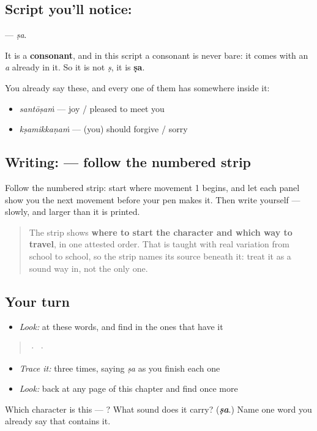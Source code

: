 \subsection*{Script you'll notice: }
\textbf{} — \emph{ṣa}.

It is a \textbf{consonant}, and in this script a consonant is never bare: it comes with an \emph{a} already in it. So it is not \emph{ṣ}, it is \textbf{ṣa}.

You already say these, and every one of them has  somewhere inside it:

\begin{itemize}
\raggedright
  \item \textbf{} \emph{santōṣaṁ} — joy / pleased to meet you
  \item \textbf{} \emph{kṣamikkaṇaṁ} — (you) should forgive / sorry
\end{itemize}

\subsection*{Writing:  — follow the numbered strip}

Follow the numbered strip: start where movement 1 begins, and let each panel show you the next movement before your pen makes it. Then write  yourself — slowly, and larger than it is printed.

\begin{quote}
The strip shows \textbf{where to start the character and which way to travel}, in one attested order. That is taught with real variation from school to school, so the strip names its source beneath it: treat it as a sound way in, not the only one.
\end{quote}

\subsection*{Your turn}
\begin{itemize}
\raggedright
  \item \emph{Look:} at these words, and find  in the ones that have it
\end{itemize}

\begin{quote}
  ·    ·  
\end{quote}

\begin{itemize}
\raggedright
  \item \emph{Trace it:}  three times, saying \emph{ṣa} as you finish each one
  \item \emph{Look:} back at any page of this chapter and find  once more
\end{itemize}

\begin{tcolorbox}[breakable,colback=teal!4,colframe=teal!35!black,title={Before you move on}]
Which character is this — ? What sound does it carry? (\emph{\textbf{ṣa}}.) Name one word you already say that contains it.
\end{tcolorbox}
